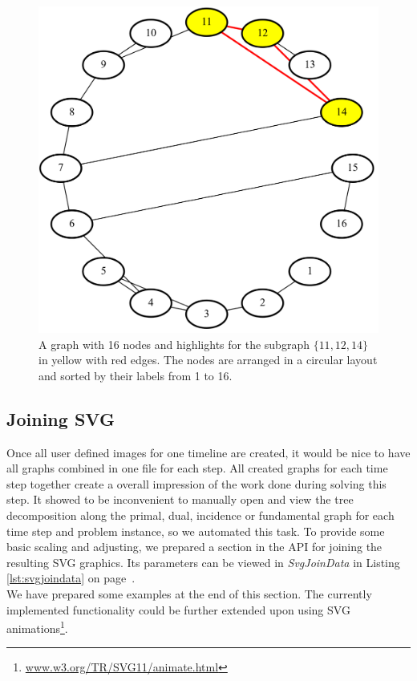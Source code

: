 \documentclass[a4paper, 12pt, bibliography=totoc]{scrartcl}
\begin{document}
\begin{figure}[H]
	\centering
	\includegraphics[width=0.6\linewidth]{images/minvc16graph9sorted.png}
	\caption[Graph with 16 nodes on a circle]{A graph with 16 nodes and highlights for the subgraph $\{11,12,14\}$ in yellow with red edges. The nodes are arranged in a circular layout and sorted by their labels from 1 to 16.}
	\label{fig:minvc16graph9sorted}
\end{figure}

\subsection{Joining SVG}\label{sec:svgjoin}
Once all user defined images for one timeline are created, it would be nice to have all graphs combined in one file for each step. All created graphs for each time step together create a overall impression of the work done during solving this step. It showed to be inconvenient to manually open and view the tree decomposition along the primal, dual, incidence or fundamental graph for each time step and problem instance, so we automated this task.
 To provide some basic scaling and adjusting, we prepared a section in the API for joining the resulting SVG graphics.
Its parameters can be viewed in \textit{SvgJoinData} in Listing \ref{lst:svgjoindata} on page~\pageref{lst:svgjoindata}. \\
We have prepared some examples at the end of this section.
The currently implemented functionality could be further extended upon using SVG animations\footnote{\url{www.w3.org/TR/SVG11/animate.html}}.\\

\end{document}
